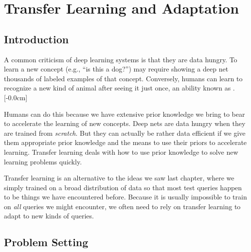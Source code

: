 
\chapter{Transfer Learning and Adaptation}
\label{chapter:transfer_learning}

\section{Introduction}

A common criticism of deep learning systems is that they are data hungry. To learn a new concept (e.g., ``is this a dog?'') may require showing a deep net thousands of labeled examples of that concept. Conversely, humans can learn to recognize a new kind of animal after seeing it just once, an ability known as .[-0.0cm]

Humans can do this because we have extensive prior knowledge we bring to bear to accelerate the learning of new concepts. Deep nets are data hungry when they are trained from \emph{scratch}. But they can actually be rather data efficient if we give them appropriate prior knowledge and the means to use their priors to accelerate learning. Transfer learning deals with how to use prior knowledge to solve new learning problems quickly.

Transfer learning is an alternative to the ideas we saw last chapter, where we simply trained on a broad distribution of data so that most test queries happen to be things we have encountered before. Because it is usually impossible to train on \textit{all} queries we might encounter, we often need to rely on transfer learning to adapt to new kinds of queries.


\section{Problem Setting}

